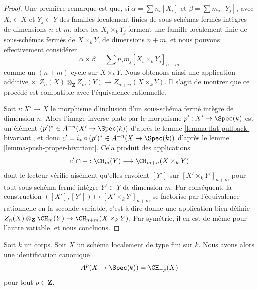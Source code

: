 \begin{proof}
Une première remarque est que, si $\alpha = \sum n_i[X_i]$
et $\beta = \sum m_j[Y_j]$, avec $X_i \subset X$ et $Y_j \subset Y$
des familles localement finies de sous-schémas fermés intègres
de dimensions $n$ et $m$, alors
les $X_i \times_k Y_j$ forment une famille localement finie
de sous-schémas fermés de $X \times_k Y$, de
dimensions $n + m$, et nous pouvons effectivement considérer
$$
\alpha \times \beta = \sum n_i m_j [X_i \times_k Y_j]_{n + m}
$$
comme un $(n + m)$-cycle sur $X \times_k Y$. Nous obtenons ainsi une
application additive
$\times : Z_n(X) \otimes_{\mathbf{Z}} Z_m(Y) \to Z_{n + m}(X \times_k Y)$.
Il s'agit de montrer que
ce procédé est compatible avec l'équivalence rationnelle.

\medskip\noindent
Soit $i : X' \to X$ le morphisme d'inclusion d'un
sous-schéma fermé intègre de dimension $n$.
Alors l'image inverse plate par le morphisme $p' : X' \to \Spec(k)$ est un élément
$(p')^* \in A^{-n}(X' \to \Spec(k))$ d'après le
lemme \ref{lemma-flat-pullback-bivariant},
et donc $c' = i_* \circ (p')^* \in A^{-n}(X \to \Spec(k))$ d'après le
lemme \ref{lemma-push-proper-bivariant}.
Cela produit des applications
$$
c' \cap - : \CH_m(Y) \longrightarrow \CH_{m + n}(X \times_k Y)
$$
dont le lecteur vérifie aisément qu'elles envoient $[Y']$ sur $[X' \times_k Y']_{n + m}$
pour tout sous-schéma fermé intègre $Y' \subset Y$ de dimension
$m$. Par conséquent, la construction
$([X'], [Y']) \mapsto [X' \times_k Y']_{n + m}$
se factorise par l'équivalence rationnelle en la seconde variable, c'est-à-dire
donne une application bien définie
$Z_n(X) \otimes_{\mathbf{Z}} \CH_m(Y) \to \CH_{n + m}(X \times_k Y)$.
Par symétrie, il en est de même pour l'autre variable, et nous concluons.
\end{proof}

\begin{lemma}
\label{lemma-chow-cohomology-towards-point}
Soit $k$ un corps. Soit $X$ un schéma localement de type fini sur $k$.
Nous avons alors une identification canonique
$$
A^p(X \to \Spec(k)) = \CH_{-p}(X)
$$
pour tout $p \in \mathbf{Z}$.
\end{lemma}

